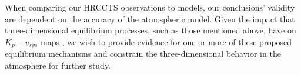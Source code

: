 \documentclass[twocolumn]{aastex631}
\begin{document}
            When comparing our HRCCTS observations to models, our conclusions' validity are dependent on the accuracy of the atmospheric model. Given the impact that three-dimensional equilibrium processes, such as those mentioned above, have on $K_p-v_{sys}$ maps \citep{Wardenier2021}, we wish to provide evidence for one or more of these proposed equilibrium mechanisms and constrain the three-dimensional behavior in the atmosphere for further study.

\end{document}
